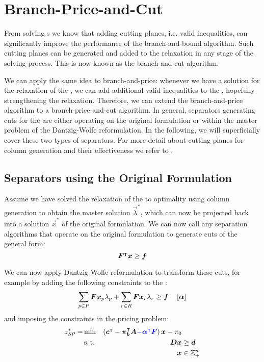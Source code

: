 \section{Branch-Price-and-Cut}\label{sec:cg_bp_bpc}
From solving \IP{}s we know that adding cutting planes, i.e. valid inequalities, can significantly improve the performance of the branch-and-bound algorithm. Such cutting planes can be generated and added to the \LP{} relaxation in any stage of the solving process. This is now known as the branch-and-cut algorithm.

We can apply the same idea to branch-and-price: whenever we have a solution for the \LP{} relaxation of the \MP{}, we can add additional valid inequalities to the \RMP{}, hopefully strengthening the relaxation. Therefore, we can extend the branch-and-price algorithm to a branch-price-and-cut algorithm. In general, separators generating cuts for the \MP{} are either operating on the original formulation or within the master problem of the Dantzig-Wolfe reformulation. In the following, we will superficially cover these two types of separators. For more detail about cutting planes for column generation and their effectiveness we refer to \cite{gamrath2010generic, witt2013separation}.

\subsection{Separators using the Original Formulation}
Assume we have solved the \LP{} relaxation of the \MP{} to optimality using column generation to obtain the master solution $\vec{\lambda}^*$, which can now be projected back into a solution $\vec{x}^*$ of the original formulation. We can now call any separation algorithms that operate on the original formulation to generate cuts of the general form:
\begin{equation}
{\bm{F}}^\intercal {\bm{x}} \geq {\bm{f}}
\end{equation}

We can now apply Dantzig-Wolfe reformulation to transform these cuts, for example by adding the following constraints to the \MP{}:
\begin{equation}
\sum_{p \in P} {\bm{F}} {\bm{x}}_p \lambda_p + \sum_{r \in R} {\bm{F}} {\bm{x}}_r \lambda_r \geq {\bm{f}} \quad \left[ {\bm{\alpha}} \right]
\end{equation}
and imposing the constraints in the pricing problem:
\begin{equation}
\begin{aligned}
z^*_\SP{} = &\min & \left( \vec{c}\transpose - \vec{\pi}_\vec{b}\transpose \mat{A} {\color{blue} - \vec{\alpha}\transpose \mat{F}}\right) \vec{x} - \pi_0 & \\
&\st & \mat{D} \vec{x} & \geq \vec{d} \\
&& \vec{x} & \in \mathbb{Z}_+^n
\end{aligned}
\end{equation}

